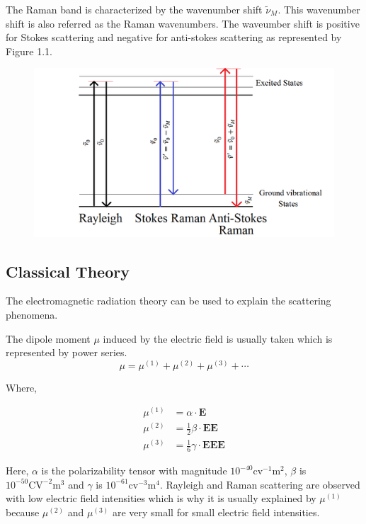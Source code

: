\documentclass[openany,11pt,a4paper]{report}
\begin{document}
The Raman band is characterized by the wavenumber shift $\tilde{\nu}_{M}$. This wavenumber shift is also referred as the Raman wavenumbers.  The waveumber shift is positive for Stokes scattering and negative for anti-stokes scattering as represented by Figure 1.1. \cite{bib2}
\begin{figure}[H]
\centering
\includegraphics[scale=1]{fig1.png}   
\caption{\cite{bib2}}
\end{figure}

\subsection{Classical Theory}

The electromagnetic radiation theory can be used to explain the scattering phenomena. 

The dipole moment $\mu$ induced by the electric field is usually taken which is represented by power series. 
\begin{equation}
\mu=\mu^{(1)}+\mu^{(2)}+\mu^{(3)}+\cdots
\end{equation}

Where,

\begin{equation}
\begin{aligned} \mu^{(1)} &=\alpha \cdot \mathbf{E} \\ \mu^{(2)} &=\frac{1}{2} \beta \cdot \mathbf{E} \mathbf{E} \\ \mu^{(3)} &=\frac{1}{6} \gamma \cdot \mathbf{E} \mathbf{E} \mathbf{E} \end{aligned}
\end{equation}

Here, $\alpha$ is the polarizability tensor with magnitude 
$10^{-40} \mathrm{cv}^{-1} \mathrm{m}^{2}$, $\beta$ is $10^{-50} \mathrm{CV}^{-2} \mathrm{m}^{3}$ and $\gamma$ is $10^{-61} \mathrm{cv}^{-3} \mathrm{m}^{4}$. Rayleigh and Raman scattering are observed with low electric field intensities which is why it is usually explained by $\mu^{(1)}$ because $\mu^{(2)}$ and $\mu^{(3)}$ are very small for small electric field intensities.
\end{document}
